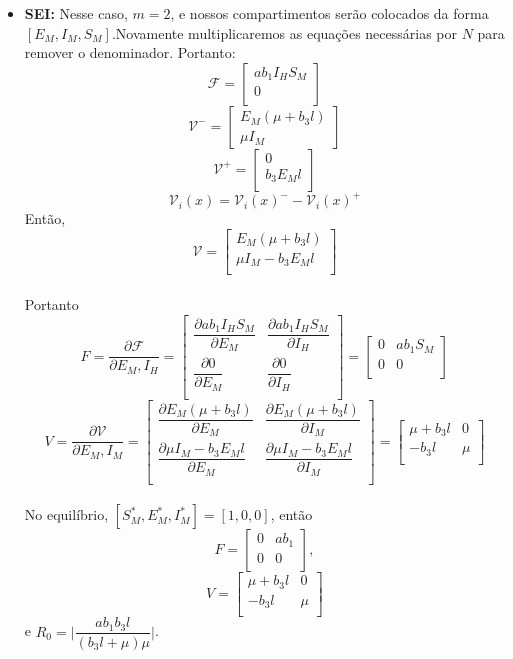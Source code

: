 \begin{itemize}
\item \textbf{SEI:}
Nesse caso, $m=2$, e nossos compartimentos serão colocados da forma $[E_M, I_M, S_M]$.Novamente multiplicaremos as equações necessárias por $N$ para remover o denominador. Portanto:
$$ {\mathcal F} =\begin{bmatrix}
a b_1 I_H S_M\\
0\\
\end{bmatrix} $$
$$
{\mathcal V^-} = \begin{bmatrix}
E_M (\mu + b_3 l)\\
\mu I_M
\end{bmatrix}
$$
$$
{\mathcal V^+} = \begin{bmatrix}
0\\
b_3 E_M l\\
\end{bmatrix}
$$
$${\mathcal V}_i (x) = {\mathcal V}_i(x)^{-} - {\mathcal V}_i(x)^+$$
Então,
$$
{\mathcal V} =
\begin{bmatrix}
E_M (\mu + b_3 l)\\
\mu I_M - b_3 E_M l\\
\end{bmatrix}
$$
\\
Portanto
$$ F = \dfrac{\partial{\mathcal F}}{\partial E_M, I_H} =\begin{bmatrix}
\dfrac{\partial ab_1 I_H S_M}{\partial E_M} & \dfrac{\partial ab_1 I_H S_M}{\partial I_H}\\
\dfrac{\partial 0}{\partial E_M} & \dfrac{\partial 0}{\partial I_H}\\
\end{bmatrix} = 
\begin{bmatrix}
0 & ab_1 S_M\\
0 & 0\\
\end{bmatrix}$$
$$ V = \dfrac{\partial{\mathcal V}}{\partial E_M, I_M} =\begin{bmatrix}
\dfrac{\partial E_M (\mu + b_3 l)}{\partial E_M} & \dfrac{\partial E_M (\mu + b_3 l)}{\partial I_M}\\
\dfrac{\partial \mu I_M - b_3 E_M l}{\partial E_M} & \dfrac{\partial \mu I_M - b_3 E_M l}{\partial I_M}\\
\end{bmatrix} = 
\begin{bmatrix}
\mu+b_3 l & 0\\
- b_3 l & \mu\\
\end{bmatrix}$$
\\No equilíbrio, $[S_M^*, E_M^*, I_M^*] = [1,0,0]$, então $$F=\begin{bmatrix}
0 & ab_1\\
0 & 0\\
\end{bmatrix},$$
$$V = \begin{bmatrix}
\mu+b_3 l & 0\\
- b_3 l & \mu\\
\end{bmatrix}$$ e $R_0 = \Big | \dfrac{ab_1b_3l}{(b_3l+\mu)\mu}\Big | $.


\end{itemize}
